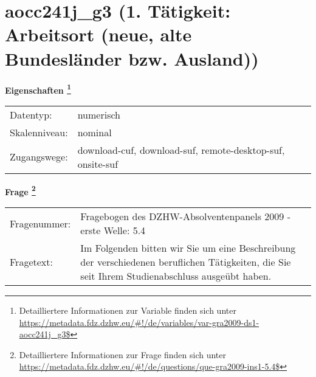 
    \setcounter{footnote}{0}

    \vspace*{-1.8cm}
	\section{aocc241j\_g3 (1. Tätigkeit: Arbeitsort (neue, alte Bundesländer bzw. Ausland))}
	\label{section:aocc241j_g3}



    \vspace*{0.5cm}
    \noindent\textbf{Eigenschaften
	\footnote{Detailliertere Informationen zur Variable finden sich unter
		\url{https://metadata.fdz.dzhw.eu/\#!/de/variables/var-gra2009-ds1-aocc241j_g3$}}}\\
	\begin{tabularx}{\hsize}{@{}lX}
	Datentyp: & numerisch \\
	Skalenniveau: & nominal \\
	Zugangswege: &
	  download-cuf, 
	  download-suf, 
	  remote-desktop-suf, 
	  onsite-suf
 \\
    \end{tabularx}



				\vspace*{0.5cm}
                \noindent\textbf{Frage
	                \footnote{Detailliertere Informationen zur Frage finden sich unter
		              \url{https://metadata.fdz.dzhw.eu/\#!/de/questions/que-gra2009-ins1-5.4$}}}\\
				\begin{tabularx}{\hsize}{@{}lX}
					Fragenummer: &
					  Fragebogen des DZHW-Absolventenpanels 2009 - erste Welle:
					  5.4
 \\
					Fragetext: & Im Folgenden bitten wir Sie um eine Beschreibung der verschiedenen beruflichen Tätigkeiten, die Sie seit Ihrem Studienabschluss ausgeübt haben. \\
				\end{tabularx}





